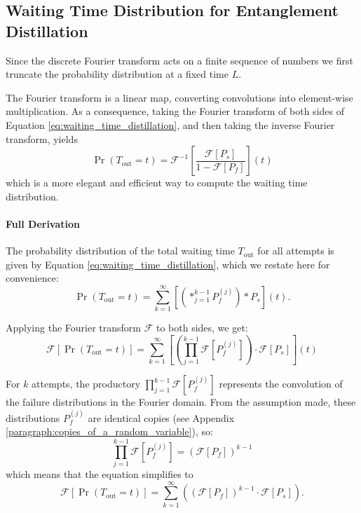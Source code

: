 \documentclass{masterthesis}
\begin{document}
\subsection*{Waiting Time Distribution for Entanglement Distillation}

Since the discrete Fourier transform acts on a finite sequence of numbers we first truncate the probability distribution at a fixed time $L$.

The Fourier transform is a linear map, converting convolutions into element-wise multiplication. As a consequence, taking the Fourier transform of both sides of Equation \ref{eq:waiting_time_distillation}, and then taking the inverse Fourier transform, yields
\begin{equation}\label{eq:waiting_time_distillation_fourier}
    \Pr(T_{\text{out}} = t) = \mathcal{F}^{-1} \left[ \frac{\mathcal{F}[P_s]}{1 - \mathcal{F}[P_f]} \right](t)
\end{equation}
which is a more elegant and efficient way to compute the waiting time distribution.

\paragraph*{Full Derivation}

The probability distribution of the total waiting time \( T_{\text{out}} \) for all attempts is given by Equation \ref{eq:waiting_time_distillation}, which we restate here for convenience:
\begin{equation}
    \Pr(T_{\text{out}} = t) = \sum_{k=1}^{\infty} \left[ \left(\ast_{j=1}^{k-1} P_f^{(j)} \right) \ast P_s \right](t) .
\end{equation}

Applying the Fourier transform \(\mathcal{F}\) to both sides, we get:
\begin{equation}
    \mathcal{F}[\Pr(T_{\text{out}} = t)] = \sum_{k=1}^{\infty} \left[ \left(\prod_{j=1}^{k-1} \mathcal{F}[P_f^{(j)}] \right) \cdot \mathcal{F}[P_s] \right](t)
\end{equation}

For $k$ attempts, the productory \(\prod_{j=1}^{k-1} \mathcal{F}[P_f^{(j)}]\) represents the convolution of the failure distributions in the Fourier domain. From the assumption made, these distributions \( P_f^{(j)} \) are identical copies (see Appendix \ref{paragraph:copies_of_a_random_variable}), so:
\begin{equation}
    \prod_{j=1}^{k-1} \mathcal{F}[P_f^{(j)}] = \left( \mathcal{F}[P_f] \right)^{k-1}
\end{equation}
which means that the equation simplifies to
\begin{equation}
    \mathcal{F}[\Pr(T_{\text{out}} = t)] = \sum_{k=1}^{\infty} \left( \left( \mathcal{F}[P_f] \right)^{k-1} \cdot \mathcal{F}[P_s] \right) .
\end{equation}
\end{document}
